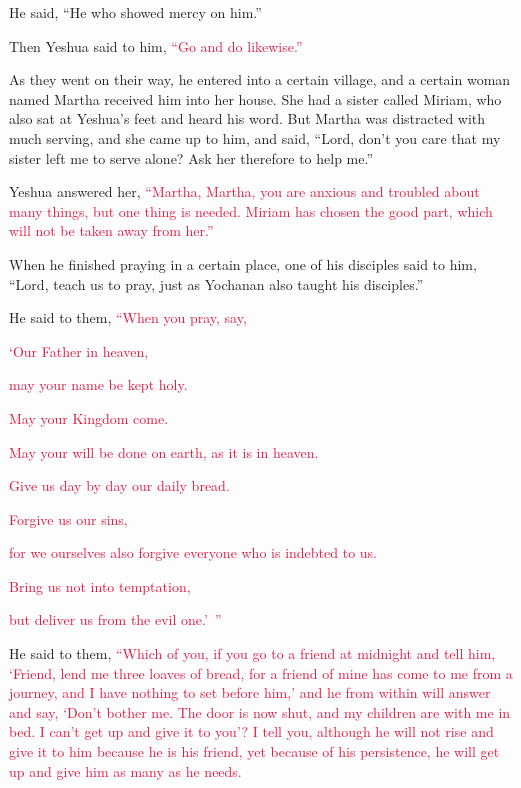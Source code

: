 \myverse{}He said, “He who showed mercy on him.”

Then Yeshua said to him,
\textcolor{crimson}{“Go and do likewise.”}

\myverse{}As they went on their way, he entered into a certain village,
and a certain woman named Martha received him into her house.
\myverse{}She had a sister called Miriam, who also sat at Yeshua’s feet and heard his
word.
\myverse{}But Martha was distracted with much serving, and she came up to him, and
said, “Lord, don’t you care that my sister left me to serve alone? Ask her therefore to help me.”

\myverse{}Yeshua answered her,
\textcolor{crimson}{“Martha, Martha, you are anxious and troubled about many things,
}
\myverse{}\textcolor{crimson}{but one thing is needed. Miriam has chosen the good part, which will
	not be taken away from her.”}


\mychapter{} \myverse*{}When he finished praying in a certain place, one of his disciples
said to him, “Lord, teach us to pray, just as Yochanan also taught his disciples.”

\myverse{}He said to them,
\textcolor{crimson}{“When you pray, say,}

\textcolor{crimson}{‘Our Father in heaven,}

\textcolor{crimson}{may your name be kept holy.}

\textcolor{crimson}{May your Kingdom come.}

\textcolor{crimson}{May your will be done on earth, as it is in heaven.}

\myverse{}\textcolor{crimson}{Give us day by day our daily bread.}

\myverse{}\textcolor{crimson}{Forgive us our sins,}

\textcolor{crimson}{for we ourselves also forgive everyone who is indebted to us.
}

\textcolor{crimson}{Bring us not into temptation,}

\textcolor{crimson}{but deliver us from the evil one.’ ”}

\myverse{}He said to them,
\textcolor{crimson}{“Which of you, if you go to a friend at midnight and tell him, ‘Friend, lend me three loaves of bread,
}
\myverse{}\textcolor{crimson}{for a friend of mine has come to me from a journey, and I have nothing
	to set before him,’
}
\myverse{}\textcolor{crimson}{and he from within will answer and say, ‘Don’t bother me. The door is now
	shut, and my children are with me in bed. I can’t get up and give it to you’?
}
\myverse{}\textcolor{crimson}{I tell you, although he will not rise and give it to him because he is
	his friend, yet because of his persistence, he will get up and give him as many as he needs.}

